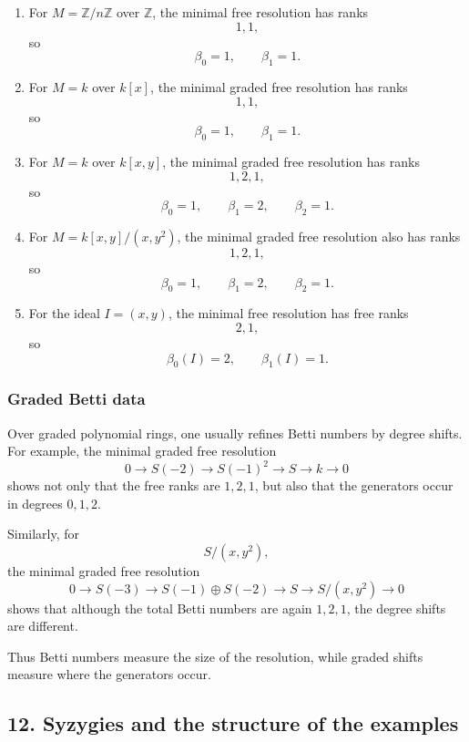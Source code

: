 \documentclass[12pt,a4paper]{article}
\theoremstyle{notespace}
\theoremstyle{definition}
\begin{document}
\begin{enumerate}
	\item For \(M=\mathbb Z/n\mathbb Z\) over \(\mathbb Z\), the minimal free resolution has ranks
	\[
	1,1,
	\]
	so
	\[
	\beta_0=1,\qquad \beta_1=1.
	\]
	
	\item For \(M=k\) over \(k[x]\), the minimal graded free resolution has ranks
	\[
	1,1,
	\]
	so
	\[
	\beta_0=1,\qquad \beta_1=1.
	\]
	
	\item For \(M=k\) over \(k[x,y]\), the minimal graded free resolution has ranks
	\[
	1,2,1,
	\]
	so
	\[
	\beta_0=1,\qquad \beta_1=2,\qquad \beta_2=1.
	\]
	
	\item For \(M=k[x,y]/(x,y^2)\), the minimal graded free resolution also has ranks
	\[
	1,2,1,
	\]
	so
	\[
	\beta_0=1,\qquad \beta_1=2,\qquad \beta_2=1.
	\]
	
	\item For the ideal \(I=(x,y)\), the minimal free resolution has free ranks
	\[
	2,1,
	\]
	so
	\[
	\beta_0(I)=2,\qquad \beta_1(I)=1.
	\]
\end{enumerate}

\subsubsection*{Graded Betti data}

Over graded polynomial rings, one usually refines Betti numbers by degree shifts.
For example, the minimal graded free resolution
\[
0 \longrightarrow S(-2) \longrightarrow S(-1)^2 \longrightarrow S \longrightarrow k \longrightarrow 0
\]
shows not only that the free ranks are \(1,2,1\), but also that the generators occur in degrees \(0,1,2\).

Similarly, for
\[
S/(x,y^2),
\]
the minimal graded free resolution
\[
0 \longrightarrow S(-3) \longrightarrow S(-1)\oplus S(-2) \longrightarrow S \longrightarrow S/(x,y^2) \longrightarrow 0
\]
shows that although the total Betti numbers are again \(1,2,1\), the degree shifts are different.

Thus Betti numbers measure the size of the resolution, while graded shifts measure where the generators occur.

\subsection{12. Syzygies and the structure of the examples}
\end{document}
